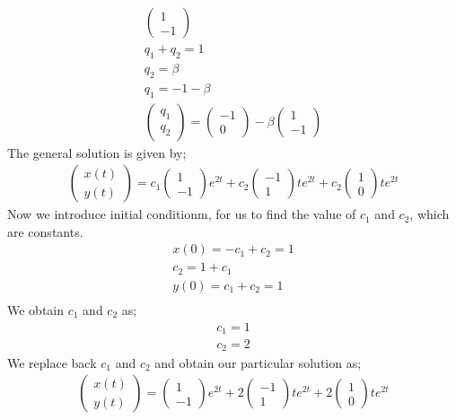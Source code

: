 \documentclass[12pt,a4paper]{article}
\begin{document}
\begin{enumerate}
\begin{eqnarray*}
\begin{pmatrix}
1 \\
-1
\end{pmatrix}\\
q_1+q_2=1\\
q_2=\beta \\
q_1=-1-\beta\\
\begin{pmatrix}
q_1 \\
q_2
\end{pmatrix}= \begin{pmatrix}
-1 \\
0
\end{pmatrix} - \beta \begin{pmatrix}
1 \\
-1
\end{pmatrix}
\end{eqnarray*}
The general solution is given by;
\begin{eqnarray*}
\begin{pmatrix}
x(t) \\
y(t)
\end{pmatrix}=c_1  \begin{pmatrix}
1 \\
-1
\end{pmatrix} e^{2t}+c_2  \begin{pmatrix}
-1 \\
1
\end{pmatrix}  t e^{2t}+ c_2  \begin{pmatrix}
1 \\
0
\end{pmatrix}  t e^{2t}
\end{eqnarray*}
Now we introduce initial conditionm, for us to find the value of $c_1$ and $c_2$, which are constants.
\begin{eqnarray*}
x(0)=-c_1+c_2=1\\
c_2=1+c_1\\
y(0)=c_1+c_2=1\\
\end{eqnarray*}
We obtain $c_1$ and $c_2$ as;
\begin{eqnarray*}
c_1=1\\
c_2=2
\end{eqnarray*}
We replace back  $c_1$ and $c_2$ and obtain our particular solution as;
\begin{eqnarray*}
\begin{pmatrix}
x(t) \\
y(t)
\end{pmatrix}=  \begin{pmatrix}
1 \\
-1
\end{pmatrix} e^{2t}+2  \begin{pmatrix}
-1 \\
1
\end{pmatrix}  t e^{2t}+ 2 \begin{pmatrix}
1 \\
0
\end{pmatrix}  t e^{2t}
\end{eqnarray*}
\end{enumerate}
\end{document}
